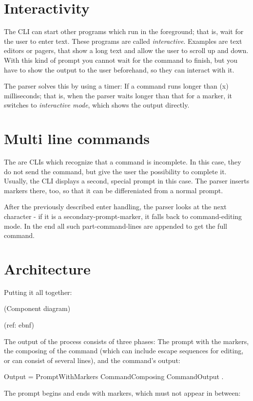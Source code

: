 \documentclass[paper=a4,twoside,abstract=on,cleardoublepage=empty,numbers=noenddot,toc=bib,12pt]{scrreprt}
\begin{document}
\section{Interactivity}

The \textsc{CLI} can start other programs which run in the foreground; that is, wait for the user to enter text. These programs are called \emph{interactive}. Examples are text editors or pagers, that show a long text and allow the user to scroll up and down. With this kind of prompt you cannot wait for the command to finish, but you have to show the output to the user beforehand, so they can interact with it.

The parser solves this by using a timer: If a command runs longer than (x) milliseconds; that is, when the parser waits longer than that for a marker, it switches to \emph{interactive mode}, which shows the output directly.

\section{Multi line commands}

The are \textsc{CLI}s which recognize that a command is incomplete. In this case, they do not send the command, but give the user the possibility to complete it. Usually, the CLI displays a second, special prompt in this case. The parser inserts markers there, too, so that it can be differeniated from a normal prompt.

After the previously described enter handling, the parser looks at the next character - if it is a secondary-prompt-marker, it falls back to command-editing mode. In the end all such part-command-lines are appended to get the full command.

\section{Architecture}

Putting it all together:

(Component diagram)

(ref: ebnf)


The output of the process consists of three phases: The prompt with the markers, the composing of the command (which can include escape sequences for editing, or can consist of several lines), and the command's output:

\begin{ebnf}
Output = { PromptWithMarkers CommandComposing CommandOutput } .
\end{ebnf}
%
The prompt begins and ends with markers, which must not appear in between:
\end{document}
